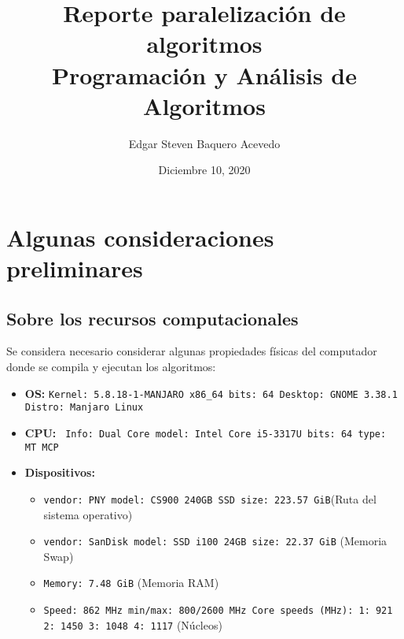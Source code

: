 \documentclass{article}
\title{Reporte paralelización de algoritmos\\ Programación y Análisis de Algoritmos}
\author{Edgar Steven Baquero Acevedo}
\date{Diciembre 10, 2020}
\begin{document}
	
\maketitle

\section{Algunas consideraciones preliminares}
\subsection*{Sobre los recursos computacionales}
Se considera necesario considerar algunas propiedades físicas del computador donde se compila y ejecutan los algoritmos:
\begin{itemize}
\item 	\textbf{OS:} \texttt{Kernel: 5.8.18-1-MANJARO x86\_64 bits: 64 Desktop: GNOME 3.38.1 
	Distro: Manjaro Linux}
\item	\textbf{CPU:} \texttt{ Info: Dual Core model: Intel Core i5-3317U bits: 64 type: MT MCP}
\item	\textbf{Dispositivos:} 
\begin{itemize}
	\item \texttt{vendor: PNY model: CS900 240GB SSD size: 223.57 GiB}\linebreak(Ruta del sistema operativo)
	\item \texttt{vendor: SanDisk model: SSD i100 24GB size: 22.37 GiB} \linebreak(Memoria Swap)
	\item \texttt{Memory: 7.48 GiB} (Memoria RAM)
	\item \texttt{Speed: 862 MHz min/max: 800/2600 MHz Core speeds (MHz): 1: 921 2: 1450 
		3: 1048 4: 1117} (Núcleos)
\end{itemize}
\end{itemize}
\end{document}
